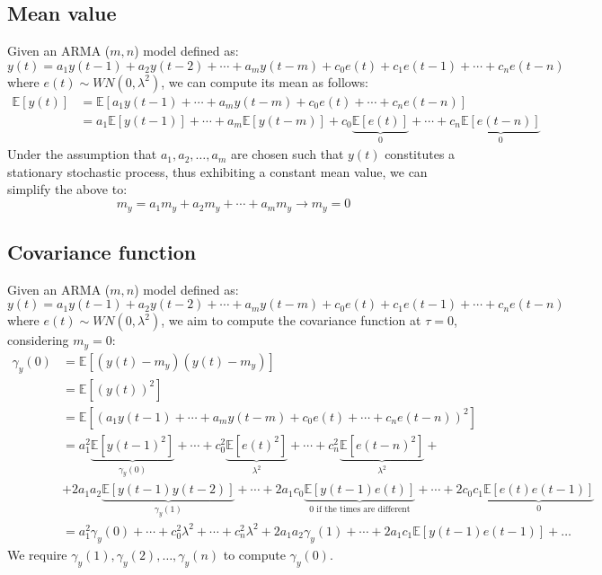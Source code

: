 \subsection{Mean value}
Given an ARMA ($m,n$) model defined as:
\[y(t)=a_1y(t-1)+a_2y(t-2)+\cdots+a_m y(t-m)+c_0e(t)+c_1e(t-1)+\cdots+c_n e(t-n)\]
where $e(t)\sim WN(0,\lambda^2)$, we can compute its mean as follows:
\begin{align*}
    \mathbb{E}\left[y(t)\right] &= \mathbb{E}\left[a_1y(t-1)+\cdots+a_m y(t-m)+c_0e(t)+\cdots+c_n e(t-n)\right] \\
                                &= a_1\mathbb{E}\left[y(t-1)\right]+\cdots+a_m\mathbb{E}\left[y(t-m)\right] +c_0\underbrace{\mathbb{E}\left[e(t)\right]}_0 +\cdots+c_n\underbrace{\mathbb{E}\left[e(t-n)\right]}_0
\end{align*}
Under the assumption that $a_1,a_2,\dots,a_m$ are chosen such that $y(t)$ constitutes a stationary stochastic process, thus exhibiting a constant mean value, we can simplify the above to:
\[m_y=a_1m_y+a_2m_y+\cdots+a_m m_y \rightarrow m_y=0\]

\subsection{Covariance function}
Given an ARMA ($m,n$) model defined as:
\[y(t)=a_1y(t-1)+a_2y(t-2)+\cdots+a_m y(t-m)+c_0e(t)+c_1e(t-1)+\cdots+c_n e(t-n)\]
where $e(t)\sim WN(0,\lambda^2)$, we aim to compute the covariance function at $\tau=0$, considering $m_y=0$:
\begin{align*}
    \gamma_y(0) &=\mathbb{E}\left[ \left(y(t)-m_y\right)\left(y(t)-m_y\right) \right] \\
                &=\mathbb{E}\left[ {\left(y(t)\right)}^2 \right] \\
                &=\mathbb{E}\left[ {\left(a_1y(t-1)+\cdots+a_m y(t-m)+c_0e(t)+\cdots+c_n e(t-n)\right)}^2 \right] \\      
                &=a_1^2\underbrace{\mathbb{E}\left[ {y(t-1)}^2 \right]}_{\gamma_y(0)} +\cdots+c_0^2\underbrace{\mathbb{E}\left[ {e(t)}^2 \right]}_{\lambda^2} +\cdots+c_n^2 \underbrace{\mathbb{E}\left[ {e(t-n)}^2 \right]}_{\lambda^2}  +\\
                &+ 2a_1a_2\underbrace{\mathbb{E}\left[ y(t-1)y(t-2) \right]}_{\gamma_y(1)}  + \cdots + 2a_1c_0\underbrace{\mathbb{E}\left[ y(t-1)e(t) \right]}_{0 \text{ if the times are different}}  + \cdots + 2c_0c_1\underbrace{\mathbb{E}\left[ e(t)e(t-1) \right]}_0  \\   
                &=a_1^2\gamma_y(0) +\cdots+c_0^2\lambda^2 +\cdots+c_n^2 \lambda^2  + 2a_1a_2\gamma_y(1)  + \cdots + 2a_1c_1\mathbb{E}\left[ y(t-1)e(t-1) \right]+\dots    
\end{align*}
We require $\gamma_y(1),\gamma_y(2),\dots,\gamma_y(n)$ to compute $\gamma_y(0)$.

